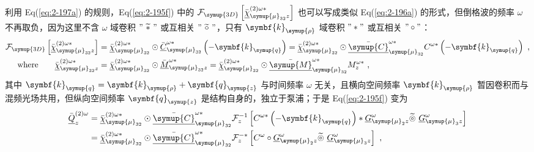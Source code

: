 利用 Eq(\ref{eq:2-197a}) 的规则，Eq(\ref{eq:2-195f}) 中的 $\mathcal F_{\symup{3D}} \left[ \bar{\underline{\chi}}^{(2)\omega*}_{ {\symup{\mu}}_{32}z} \right]$ 也可以写成类似 Eq(\ref{eq:2-196a}) 的形式，但倒格波的频率 $\omega$ 不再取负，因为这里不含 $\omega$ 域卷积 $"\ \widetilde *\ "$ 或互相关 $"\ \widetilde \circ\ "$，只有 $\symbf{k}_{\symup{\rho}}$ 域卷积 $"*"$ 或互相关 $"\circ"$：
\begin{subequations} \label{eq:2-201}
	\abovedisplayskip=13pt
	\belowdisplayskip=13pt
	\begin{align}
		\mathcal F_{\symup{3D}} \left[ \bar{\underline{\chi}}^{(2)\omega*}_{ {\symup{\mu}}_{32}z} \right] &= \bar{\underline{\chi}}^{(2)\omega*}_{{\symup{\mu}}_{32}} \odot \bar{\underline{C}}^{\omega*}_{{\symup{\mu}}_{32}} \left( - \symbf{k}_{\symup{q}} \right) = \bar{\underline{\chi}}^{(2)\omega*}_{{\symup{\mu}}_{32}} \odot \bar{\underline{\symup{C}}}^{\omega*}_{{\symup{\mu}}_{32}} C^{\omega*} \left( - \symbf{k}_{\symup{q}} \right) \label{eq:2-201a}~, \\ \text{where}\ \ \ \ \ \ \bar{\underline{\chi}}^{(2)\omega*}_{{\symup{\mu}}_{32}z} &= \bar{\underline{\chi}}^{(2)\omega*}_{{\symup{\mu}}_{32}} \odot \bar{\underline{M}}^{\omega*}_{{\symup{\mu}}_{32}z} = \bar{\underline{\chi}}^{(2)\omega*}_{{\symup{\mu}}_{32}} \odot \bar{\underline{\symup{M}}}^{\omega*}_{{\symup{\mu}}_{32}} M^{\omega*}_{z} \label{eq:2-201b}~,
	\end{align}
\end{subequations}
其中 $\symbf{k}_{\symup{q}} = \symbf{k}_{\symup{\rho}} + \symbf{q}_{\symup{z}}$ 与时间频率 $\omega$ 无关，且横向空间频率 $\symbf{k}_{\symup{\rho}}$ 暂因卷积而与混频光场共用，但纵向空间频率 $\symbf{q}_{\symup{z}}$ 是结构自身的，独立于泵浦；于是 Eq(\ref{eq:2-195f}) 变为
\begin{subequations} \label{eq:2-202}
	\abovedisplayskip=10pt
	\belowdisplayskip=10pt
	\begin{align}
		\bar{\underline{Q}}^{(2)\omega}_{z} &= \bar{\underline{\chi}}^{(2)\omega*}_{{\symup{\mu}}_{32}} \odot \bar{\underline{\symup{C}}}^{\omega*}_{{\symup{\mu}}_{32}} \mathcal F^{-1}_{z} \left[ C^{\omega*} \left( - \symbf{k}_{\symup{q}} \right) * \underline{G}^{\omega}_{{\symup{\mu}}_2 z} \widetilde \circledcirc\ \underline{G}^{\omega}_{{\symup{\mu}}_3 z} \right] \label{eq:2-202a} \\ &= \bar{\underline{\chi}}^{(2)\omega*}_{{\symup{\mu}}_{32}} \odot \bar{\underline{\symup{C}}}^{\omega*}_{{\symup{\mu}}_{32}} \mathcal F^{-*}_{z} \left[ C^{\omega} \circ \underline{G}^{\omega}_{{\symup{\mu}}_2 z} \widetilde \circledcirc\ \underline{G}^{\omega}_{{\symup{\mu}}_3 z} \right] \label{eq:2-202b}~,
	\end{align}
\end{subequations}

